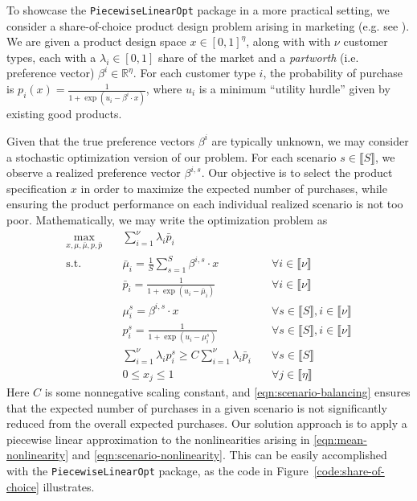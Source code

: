 \documentclass[opre,nonblindrev]{informs3} %
\newcommand{\bbR}{\mathbb{R}}
\begin{document}
To showcase the \texttt{PiecewiseLinearOpt} package in a more practical setting, we consider a share-of-choice product design problem arising in marketing (e.g. see \citep{Bertsimas:2015b,Camm:2006,Wang:2009}). We are given a product design space $x \in [0,1]^\eta$, along with with $\nu$ customer types, each with a $\lambda_i \in [0,1]$ share of the market and a \emph{partworth} (i.e. preference vector) $\beta^i \in \bbR^\eta$. For each customer type $i$, the probability of purchase is $p_i(x) = \frac{1}{1 + \exp(u_i-\beta^i \cdot x)}$, where $u_i$ is a minimum ``utility hurdle'' given by existing good products. 

Given that the true preference vectors $\beta^i$ are typically unknown, we may consider a stochastic optimization version of our problem. For each scenario $s \in \llbracket S \rrbracket$, we observe a realized preference vector $\beta^{i,s}$. Our objective is to select the product specification $x$ in order to maximize the expected number of purchases, while ensuring the product performance on each individual realized scenario is not too poor. Mathematically, we may write the optimization problem as
\begin{subequations}
\begin{alignat}{2}
    \max_{x,\mu,\bar{\mu},p,\bar{p}}\quad& \sum_{i=1}^\nu \lambda_i \bar{p}_i \\
    \text{s.t.}\quad& \bar{\mu}_i = \frac{1}{S}\sum_{s=1}^S\beta^{i,s} \cdot x \quad &\forall i \in \llbracket \nu \rrbracket \\
    & \bar{p}_i = \frac{1}{1 + \exp(u_i-\bar{\mu}_i)} \quad &\forall i \in \llbracket \nu \rrbracket \label{eqn:mean-nonlinearity} \\
    & \mu^s_i = \beta^{i,s} \cdot x \quad &\forall s \in \llbracket S \rrbracket, i \in \llbracket \nu \rrbracket \\
    & p^s_i = \frac{1}{1 + \exp(u_i-\mu^s_i)} \quad &\forall s \in \llbracket S \rrbracket, i \in \llbracket \nu \rrbracket \label{eqn:scenario-nonlinearity} \\
    & \sum_{i=1}^\nu \lambda_i p^s_i \geq C \sum_{i=1}^\nu \lambda_i \bar{p}_i \quad &\forall s \in \llbracket S \rrbracket \label{eqn:scenario-balancing} \\
    & 0 \leq x_j \leq 1 \quad &\forall j \in \llbracket \eta \rrbracket
\end{alignat}
\end{subequations}
Here $C$ is some nonnegative scaling constant, and \eqref{eqn:scenario-balancing} ensures that the expected number of purchases in a given scenario is not significantly reduced from the overall expected purchases. Our solution approach is to apply a piecewise linear approximation to the nonlinearities arising in \eqref{eqn:mean-nonlinearity} and \eqref{eqn:scenario-nonlinearity}. This can be easily accomplished with the \texttt{PiecewiseLinearOpt} package, as the code in Figure~\ref{code:share-of-choice} illustrates.
\end{document}
